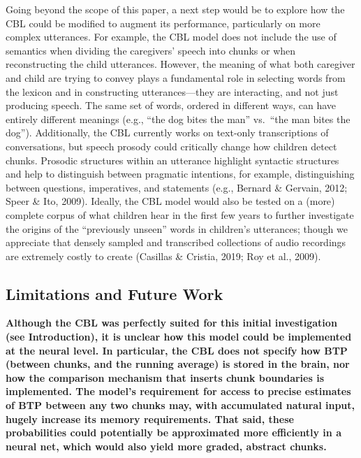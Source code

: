 \documentclass[
  english,
  man,mask,floatsintext]{apa6}
\begin{document}
Going beyond the scope of this paper, a next step would be to explore how the CBL could be modified to augment its performance, particularly on more complex utterances. For example, the CBL model does not include the use of semantics when dividing the caregivers' speech into chunks or when reconstructing the child utterances. However, the meaning of what both caregiver and child are trying to convey plays a fundamental role in selecting words from the lexicon and in constructing utterances---they are interacting, and not just producing speech. The same set of words, ordered in different ways, can have entirely different meanings (e.g., \enquote{the dog bites the man} vs.~\enquote{the man bites the dog}). Additionally, the CBL currently works on text-only transcriptions of conversations, but speech prosody could critically change how children detect chunks. Prosodic structures within an utterance highlight syntactic structures and help to distinguish between pragmatic intentions, for example, distinguishing between questions, imperatives, and statements (e.g., Bernard \& Gervain, 2012; Speer \& Ito, 2009). Ideally, the CBL model would also be tested on a (more) complete corpus of what children hear in the first few years to further investigate the origins of the \enquote{previously unseen} words in children's utterances; though we appreciate that densely sampled and transcribed collections of audio recordings are extremely costly to create (Casillas \& Cristia, 2019; Roy et al., 2009).

\hypertarget{limitations-and-future-work}{%
\subsection{Limitations and Future Work}\label{limitations-and-future-work}}

\textbf{Although the CBL was perfectly suited for this initial investigation (see Introduction), it is unclear how this model could be implemented at the neural level. In particular, the CBL does not specify how BTP (between chunks, and the running average) is stored in the brain, nor how the comparison mechanism that inserts chunk boundaries is implemented. The model's requirement for access to precise estimates of BTP between any two chunks may, with accumulated natural input, hugely increase its memory requirements. That said, these probabilities could potentially be approximated more efficiently in a neural net, which would also yield more graded, abstract chunks.}
\end{document}
